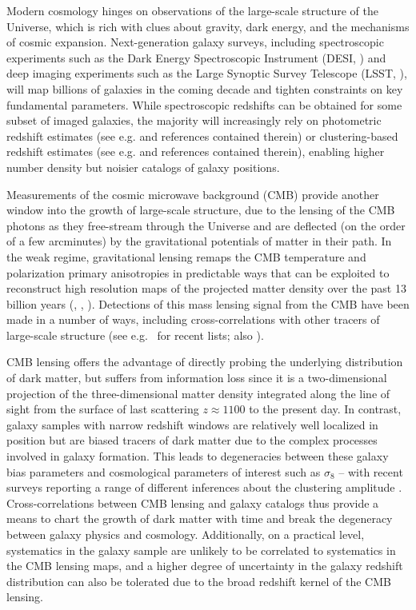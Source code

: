 Modern cosmology hinges on observations of the large-scale structure of the Universe, which is rich with clues about gravity, dark energy, and the mechanisms of cosmic expansion. Next-generation galaxy surveys, including spectroscopic experiments such as the Dark Energy Spectroscopic Instrument (DESI, \citealt{DESI16}) and deep imaging experiments such as the Large Synoptic Survey Telescope (LSST, \citealt{LSST09}), will map billions of galaxies in the coming decade and tighten constraints on key fundamental parameters. While spectroscopic redshifts can be obtained for some subset of imaged galaxies, the majority will increasingly rely on photometric redshift estimates (see e.g. \citealt{Hogg98} and references contained therein) or clustering-based redshift estimates (see e.g. \citealt{Newman08} and references contained therein), enabling higher number density but noisier catalogs of galaxy positions.

Measurements of the cosmic microwave background (CMB) provide another window into the growth of large-scale structure, due to the lensing of the CMB photons as they free-stream through the Universe and are deflected (on the order of a few arcminutes) by the gravitational potentials of matter in their path. In the weak regime, gravitational lensing remaps the CMB temperature and polarization primary anisotropies in predictable ways that can be exploited to reconstruct high resolution maps of the projected matter density over the past 13 billion years (\citealt{ZaldarriagaSeljak99}, \citealt{HuOkamoto02}, \citealt{LewisChallinor06}). Detections of this mass lensing signal from the CMB have been made in a number of ways, including cross-correlations with other tracers of large-scale structure (see e.g.\ \citealt{PlanckI,Omori++19} for recent lists; also \citealt{Krolewski19}).

CMB lensing offers the advantage of directly probing the underlying distribution of dark matter, but suffers from information loss since it is a two-dimensional projection of the three-dimensional matter density integrated along the line of sight from the surface of last scattering $z \approx 1100$ to the present day. In contrast, galaxy samples with narrow redshift windows are relatively well localized in position but are biased tracers of dark matter due to the complex processes involved in galaxy formation. This leads to degeneracies between these galaxy bias parameters and cosmological parameters of interest such as $\sigma_8$ -- with recent surveys reporting a range of different inferences about the clustering amplitude \citep[e.g.][and references therein]{PlanckVI,Troxel18,Hikage19,Troster20,Philcox20,eBOSS20}. Cross-correlations between CMB lensing and galaxy catalogs thus provide a means to chart the growth of dark matter with time and break the degeneracy between galaxy physics and cosmology. Additionally, on a practical level, systematics in the galaxy sample are unlikely to be correlated to systematics in the CMB lensing maps, and a higher degree of uncertainty in the galaxy redshift distribution can also be tolerated due to the broad redshift kernel of the CMB lensing.


